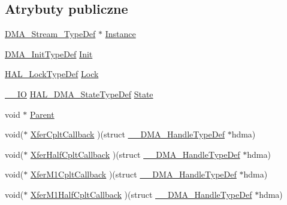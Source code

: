 \subsection*{Atrybuty publiczne}
\begin{DoxyCompactItemize}
\item 
\hyperlink{struct_d_m_a___stream___type_def}{D\+M\+A\+\_\+\+Stream\+\_\+\+Type\+Def} $\ast$ \hyperlink{struct_____d_m_a___handle_type_def_ac4b645b1c2beb1107dbec7dae98747e1}{Instance}
\item 
\hyperlink{struct_d_m_a___init_type_def}{D\+M\+A\+\_\+\+Init\+Type\+Def} \hyperlink{struct_____d_m_a___handle_type_def_a3792cb34cedb0e2ab204e41b53ef75ad}{Init}
\item 
\hyperlink{stm32f4xx__hal__def_8h_ab367482e943333a1299294eadaad284b}{H\+A\+L\+\_\+\+Lock\+Type\+Def} \hyperlink{struct_____d_m_a___handle_type_def_a005e867f695aa4b85aca665af7345b51}{Lock}
\item 
\hyperlink{core__sc300_8h_aec43007d9998a0a0e01faede4133d6be}{\+\_\+\+\_\+\+IO} \hyperlink{group___d_m_a___exported___types_ga9c012af359987a240826f29073bbe463}{H\+A\+L\+\_\+\+D\+M\+A\+\_\+\+State\+Type\+Def} \hyperlink{struct_____d_m_a___handle_type_def_a9759b676141bec799cdab94c3e08e6e4}{State}
\item 
void $\ast$ \hyperlink{struct_____d_m_a___handle_type_def_af42684decd26b1c5d49a529fcf99be30}{Parent}
\item 
void($\ast$ \hyperlink{struct_____d_m_a___handle_type_def_a4f323d8234b3f5f454a639e9df3cba23}{Xfer\+Cplt\+Callback} )(struct \hyperlink{struct_____d_m_a___handle_type_def}{\+\_\+\+\_\+\+D\+M\+A\+\_\+\+Handle\+Type\+Def} $\ast$hdma)
\item 
void($\ast$ \hyperlink{struct_____d_m_a___handle_type_def_a2e343c6a9135222a8efb8ca5bb5dad8c}{Xfer\+Half\+Cplt\+Callback} )(struct \hyperlink{struct_____d_m_a___handle_type_def}{\+\_\+\+\_\+\+D\+M\+A\+\_\+\+Handle\+Type\+Def} $\ast$hdma)
\item 
void($\ast$ \hyperlink{struct_____d_m_a___handle_type_def_a5968053a3674b44460c1aa150499e01d}{Xfer\+M1\+Cplt\+Callback} )(struct \hyperlink{struct_____d_m_a___handle_type_def}{\+\_\+\+\_\+\+D\+M\+A\+\_\+\+Handle\+Type\+Def} $\ast$hdma)
\item 
void($\ast$ \hyperlink{struct_____d_m_a___handle_type_def_aea9b02c5206e1b12380e0b83b5281e0d}{Xfer\+M1\+Half\+Cplt\+Callback} )(struct \hyperlink{struct_____d_m_a___handle_type_def}{\+\_\+\+\_\+\+D\+M\+A\+\_\+\+Handle\+Type\+Def} $\ast$hdma)
\item 

\end{DoxyCompactItemize}

